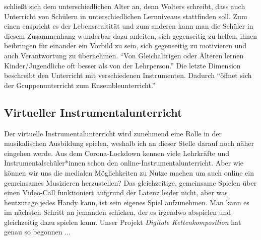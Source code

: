 schließt sich dem unterschiedlichen Alter an, denn Wolters schreibt, dass auch
Unterricht von Schülern in unterschiedlichen Lernniveaus stattfinden soll. Zum
einen enspricht es der Lebensrealtität und zum anderen kann man die Schüler in
diesem Zusammenhang wunderbar dazu anleiten, sich gegenseitig zu helfen, ihnen
beibringen für einander ein Vorbild zu sein, sich gegenseitig zu motivieren und
auch Verantwortung zu übernehmen. \enquote{Von Gleichaltrigen oder Älteren lernen
Kinder/Jugendliche oft besser als von der Lehrperson.}
\autocite[87]{ernst:die_zukunftsfaehige_musikschule} Die letzte Dimension
beschreibt den Unterricht mit verschiedenen Instrumenten. Dadurch \enquote{öffnet sich
der Gruppenunterricht zum Ensembleunterricht.}
\autocite[87]{ernst:die_zukunftsfaehige_musikschule}



\subsection{Virtueller Instrumentalunterricht} 
Der virtuelle Instrumentalunterricht wird zunehmend eine Rolle in der
musikalischen Ausbildung spielen, weshalb ich an dieser Stelle darauf noch näher
eingehen werde. Aus dem Corona-Lockdown kennen viele Lehrkräfte und
Instrumentalschüler*innen schon den online-Instrumentalunterricht. Aber wie
können wir uns die medialen Möglichkeiten zu Nutze machen um auch online ein
gemeinsames Musizieren herzustellen? Das gleichzeitige, gemeinsame Spielen über
einen Video-Call funktioniert aufgrund der Latenz leider nicht, aber was
heutzutage jedes Handy kann, ist sein eigenes Spiel aufzunehmen. Man kann es im
nächsten Schritt an jemanden schicken, der es irgendwo abspielen und
gleichzeitig dazu spielen kann. Unser Projekt \emph{Digitale Kettenkomposition}
hat genau so begonnen ...
